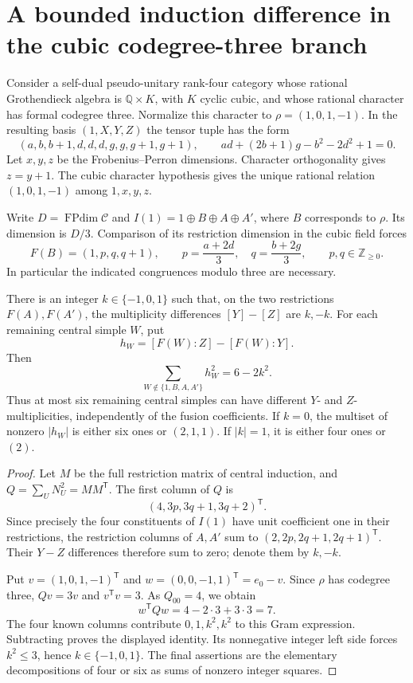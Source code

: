 \section{A bounded induction difference in the cubic codegree-three branch}
\label{sec:cubic-codegree-three-difference}
Consider a self-dual pseudo-unitary rank-four category whose rational Grothendieck
algebra is $\mathbb Q\times K$, with $K$ cyclic cubic, and whose rational
character has formal codegree three. Normalize this character to
$\rho=(1,0,1,-1)$. In the resulting basis $(1,X,Y,Z)$ the tensor tuple
has the form
\[
 (a,b,b+1,d,d,d,g,g,g+1,g+1),\qquad
 ad+(2b+1)g-b^2-2d^2+1=0.
\]
Let $x,y,z$ be the Frobenius--Perron dimensions. Character orthogonality
gives $z=y+1$. The cubic character hypothesis gives the unique rational
relation $(1,0,1,-1)$ among $1,x,y,z$.

Write $D=\operatorname{FPdim}\mathcal C$ and
$I(1)=1\oplus B\oplus A\oplus A'$, where $B$ corresponds to $\rho$.
Its dimension is $D/3$. Comparison of its restriction dimension in the
cubic field forces
\[
 F(B)=(1,p,q,q+1),\qquad
 p=\frac{a+2d}{3},\quad q=\frac{b+2g}{3},\qquad
 p,q\in\mathbb Z_{\geq0}.
\]
In particular the indicated congruences modulo three are necessary.

\begin{proposition}\label{prop:cubic-bounded-difference}
There is an integer $k\in\{-1,0,1\}$ such that, on the two restrictions
$F(A),F(A')$, the multiplicity differences $[Y]-[Z]$ are $k,-k$.
For each remaining central simple $W$, put
\[
 h_W=[F(W):Z]-[F(W):Y].
\]
Then
\[
 \sum_{W\notin\{1,B,A,A'\}}h_W^2=6-2k^2.
\]
Thus at most six remaining central simples can have different
$Y$- and $Z$-multiplicities, independently of the fusion coefficients.
If $k=0$, the multiset of nonzero $|h_W|$ is either six ones or
$(2,1,1)$. If $|k|=1$, it is either four ones or $(2)$.
\end{proposition}
\begin{proof}
Let $M$ be the full restriction matrix of central induction, and
$Q=\sum_U N_U^2=MM^{\mathsf T}$. The first column of $Q$ is
\[
 (4,3p,3q+1,3q+2)^{\mathsf T}.
\]
Since precisely the four constituents of $I(1)$ have unit coefficient
one in their restrictions, the restriction columns of $A,A'$ sum to
$(2,2p,2q+1,2q+1)^{\mathsf T}$. Their $Y-Z$ differences therefore
sum to zero; denote them by $k,-k$.

Put $v=(1,0,1,-1)^{\mathsf T}$ and
$w=(0,0,-1,1)^{\mathsf T}=e_0-v$. Since $\rho$ has codegree three,
$Qv=3v$ and $v^{\mathsf T}v=3$. As $Q_{00}=4$, we obtain
\[
 w^{\mathsf T}Qw=4-2\cdot3+3\cdot3=7.
\]
The four known columns contribute $0,1,k^2,k^2$ to this Gram expression.
Subtracting proves the displayed identity. Its nonnegative integer left
side forces $k^2\leq3$, hence $k\in\{-1,0,1\}$. The final assertions
are the elementary decompositions of four or six as sums of nonzero
integer squares.
\end{proof}


